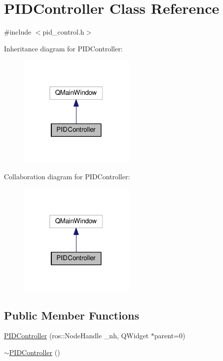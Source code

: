 \hypertarget{classPIDController}{}\section{P\+I\+D\+Controller Class Reference}
\label{classPIDController}


{\ttfamily \#include $<$pid\+\_\+control.\+h$>$}



Inheritance diagram for P\+I\+D\+Controller\+:\nopagebreak
\begin{figure}[H]
\begin{center}
\leavevmode
\includegraphics[width=160pt]{classPIDController__inherit__graph}
\end{center}
\end{figure}


Collaboration diagram for P\+I\+D\+Controller\+:\nopagebreak
\begin{figure}[H]
\begin{center}
\leavevmode
\includegraphics[width=160pt]{classPIDController__coll__graph}
\end{center}
\end{figure}
\subsection*{Public Member Functions}
\begin{DoxyCompactItemize}
\item 
\hyperlink{classPIDController_a940e36980116e998daa85ddd4dc42af6}{P\+I\+D\+Controller} (ros\+::\+Node\+Handle \+\_\+nh, Q\+Widget $\ast$parent=0)
\item 
\hyperlink{classPIDController_a690e7ad4796e5c5143aa4b90f2f6677b}{$\sim$\+P\+I\+D\+Controller} ()
\end{DoxyCompactItemize}
